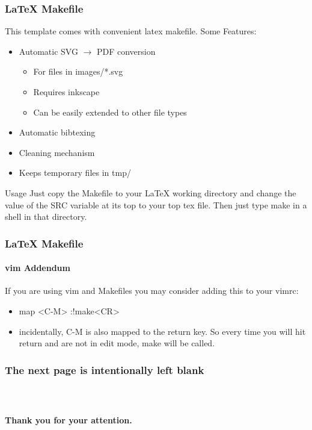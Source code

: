 \documentclass[10pt]{beamer}
\begin{document}
\begin{frame}
  \frametitle{\LaTeX{} Makefile}
  This template comes with convenient latex makefile. Some Features:
  \begin{itemize}
    \item 
      Automatic SVG $\rightarrow$ PDF conversion
      \begin{itemize}
        \item 
          For files in images/*.svg
        \item
          Requires inkscape
        \item
          Can be easily extended to other file types
      \end{itemize}
    \item
      Automatic bibtexing
    \item
      Cleaning mechanism
    \item
      Keeps temporary files in tmp/
  \end{itemize}
  \begin{exampleblock}{Usage}
    Just copy the Makefile to your \LaTeX{} working directory and change
    the value of the SRC variable at its top to your top tex file. Then
    just type make in a shell in that directory.
  \end{exampleblock}
\end{frame}

\begin{frame}
  \frametitle{\LaTeX{} Makefile}
  \framesubtitle{vim Addendum}
  If you are using vim and Makefiles you may consider adding this to your 
  vimrc:
  \begin{itemize}
    \item 
      map <C-M> :!make<CR>
    \item
      incidentally, C-M is also mapped to the return key. So every time
      you will hit return and are not in edit mode, make will be called.
  \end{itemize}
\end{frame}

\begin{frame}
  \frametitle{The next page is intentionally left blank}
\end{frame}

\begin{frame}
  \frametitle{~}
\end{frame}

\appendix
\begin{frame}[plain]
  \ugoeAddLogo
  \begin{center}
    \textbf{\Large Thank you for your attention.}
  \end{center}
\end{frame}
\end{document}
